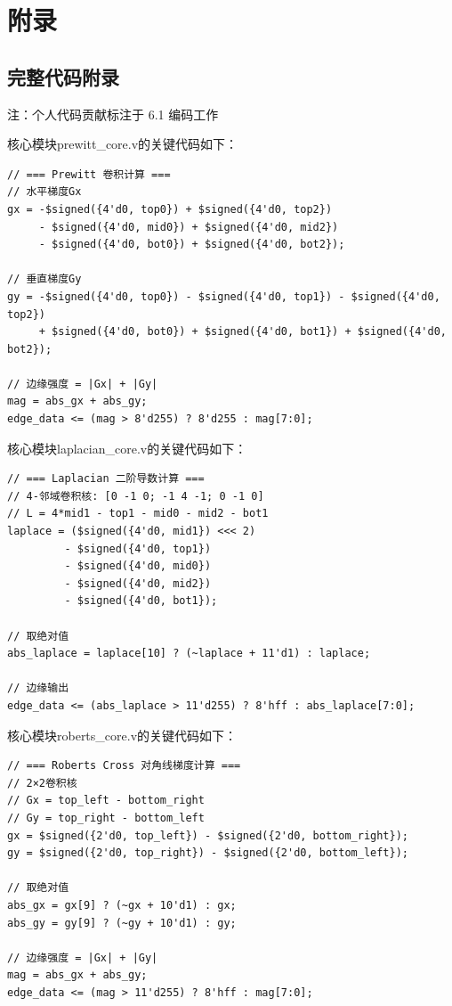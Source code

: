 
\section{附录}

\subsection{完整代码附录}

注：个人代码贡献标注于 6.1 编码工作

核心模块prewitt\_core.v的关键代码如下：

\begin{lstlisting}[style=Verilog, title=\texttt{prewitt\_core.v 核心代码}]
// === Prewitt 卷积计算 ===
// 水平梯度Gx
gx = -$signed({4'd0, top0}) + $signed({4'd0, top2})
     - $signed({4'd0, mid0}) + $signed({4'd0, mid2})
     - $signed({4'd0, bot0}) + $signed({4'd0, bot2});

// 垂直梯度Gy
gy = -$signed({4'd0, top0}) - $signed({4'd0, top1}) - $signed({4'd0, top2})
     + $signed({4'd0, bot0}) + $signed({4'd0, bot1}) + $signed({4'd0, bot2});

// 边缘强度 = |Gx| + |Gy|
mag = abs_gx + abs_gy;
edge_data <= (mag > 8'd255) ? 8'd255 : mag[7:0];
\end{lstlisting}

核心模块laplacian\_core.v的关键代码如下：

\begin{lstlisting}[style=Verilog, title=\texttt{laplacian\_core.v 核心代码}]
// === Laplacian 二阶导数计算 ===
// 4-邻域卷积核: [0 -1 0; -1 4 -1; 0 -1 0]
// L = 4*mid1 - top1 - mid0 - mid2 - bot1
laplace = ($signed({4'd0, mid1}) <<< 2)
         - $signed({4'd0, top1})
         - $signed({4'd0, mid0})
         - $signed({4'd0, mid2})
         - $signed({4'd0, bot1});

// 取绝对值
abs_laplace = laplace[10] ? (~laplace + 11'd1) : laplace;

// 边缘输出
edge_data <= (abs_laplace > 11'd255) ? 8'hff : abs_laplace[7:0];
\end{lstlisting}

核心模块roberts\_core.v的关键代码如下：

\begin{lstlisting}[style=Verilog, title=\texttt{roberts\_core.v 核心代码}]
// === Roberts Cross 对角线梯度计算 ===
// 2×2卷积核
// Gx = top_left - bottom_right
// Gy = top_right - bottom_left
gx = $signed({2'd0, top_left}) - $signed({2'd0, bottom_right});
gy = $signed({2'd0, top_right}) - $signed({2'd0, bottom_left});

// 取绝对值
abs_gx = gx[9] ? (~gx + 10'd1) : gx;
abs_gy = gy[9] ? (~gy + 10'd1) : gy;

// 边缘强度 = |Gx| + |Gy|
mag = abs_gx + abs_gy;
edge_data <= (mag > 11'd255) ? 8'hff : mag[7:0];
\end{lstlisting}

